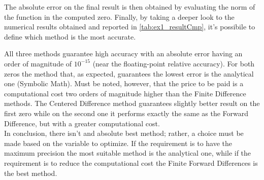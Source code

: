 \documentclass[11pt,a4paper,oneside]{article}
\begin{document}
The absolute error on the final result is then obtained by evaluating the norm of the function in the computed zero. 
Finally, by taking a deeper look to the numerical results obtained and reported in \cref{tab:ex1_resultCmp}, it's possibile to define which method is the most accurate.

\begin{table}[ht]
    \centering
    \hspace{0.05\linewidth}     %
    \caption{Methods compare on zeros computation}
    \label{tab:ex1_resultCmp}
\end{table}

All three methods guarantee high accuracy with an absolute error having an order of magnitude of $10^{-15}$ (near the floating-point relative accuracy).
For both zeros the method that, as expected, guarantees the lowest error is the analytical one (Symbolic Math).
Must be noted, however, that the price to be paid is a computational cost two orders of magnitude higher than the Finite Difference methods.
The Centered Difference method guarantees slightly better result on the first zero while on the second one it performs exactly the same as the Forward Difference, but with a greater computational cost.
\\
In conclusion, there isn't and absolute best method; rather, a choice must be made based on the variable to optimize.
If the requirement is to have the maximum precision the most suitable method is the analytical one, while if the requirement is to reduce the computational cost the Finite Forward Differences is the best method.
\end{document}
